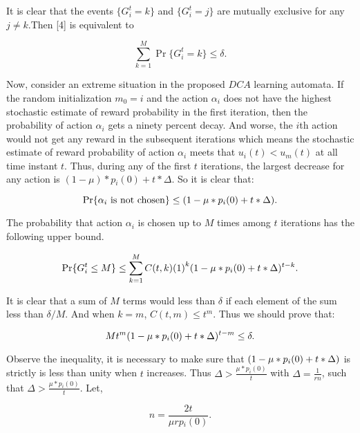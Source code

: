 It is clear that the events $\{ G_i^t = k\} $ and $\{ G_i^t = j\} $ are mutually exclusive for any $j \ne k$.Then [4] is equivalent to

\begin{equation}
\sum\limits_{k = 1}^M {\Pr \{ G_i^t = k\} }  \le \delta .
\end{equation}

Now, consider an extreme situation in the proposed $DCA$ learning automata. If the random initialization ${m_0} = i$ and the action ${\alpha _i}$ does not have the highest stochastic estimate of reward probability in the first iteration, then the probability of action ${\alpha _i}$ gets a ninety percent decay. And worse, the $i$th action would not get any reward in the subsequent iterations which means the stochastic estimate of reward probability of action ${\alpha _i}$ meets that ${u_i}(t) < {u_m}(t)$ at all time instant $t$. Thus, during any of the first $t$ iterations, the largest decrease for any action is $(1-\mu)*p{}_i(0) + t*\Delta $. So it is clear that:

\begin{equation}
\Pr \{ \alpha {}_i{\rm{\ is\ not\ chosen\} }} \le {\rm{(1}} - \mu*{p_i}(0) + t*\Delta ).
\end{equation}

The probability that action ${\alpha_i}$ is chosen up to $M$ times among $t$ iterations has the following upper bound.

\begin{equation}
\Pr \{ G_i^t \le M{\rm{\} }} \le \sum\limits_{k = 1}^M {C(t,k){{(1)}^k}(} {\rm{1}} - \mu*{p_i}(0) + t*\Delta {)^{t - k}}.
\end{equation}

It is clear that a sum of $M$ terms would less than $\delta $ if each element of the sum less than $\delta /M$. And when $k = m$, $C(t,m) \le {t^m}$. Thus we should prove that:

\begin{equation}
M{t^m}{{\rm{(1}} - \mu*{p_i}(0) + t*\Delta )^{t - m}} \le \delta .
\end{equation}

Observe the inequality, it is necessary to make sure that ${\rm{(1}} - \mu*{p_i}(0) + t*\Delta )$ is strictly is less than unity when $t$ increases. Thus $\Delta  > \frac{{\mu*{p_i}(0)}}{t}$ with $\Delta  = \frac{1}{{rn}}$, such that $\Delta  > \frac{{\mu *{p_i}(0)}}{t}$. Let,

\begin{equation}
n = \frac{{2t}}{{\mu rp{}_i(0)}}.
\end{equation}

